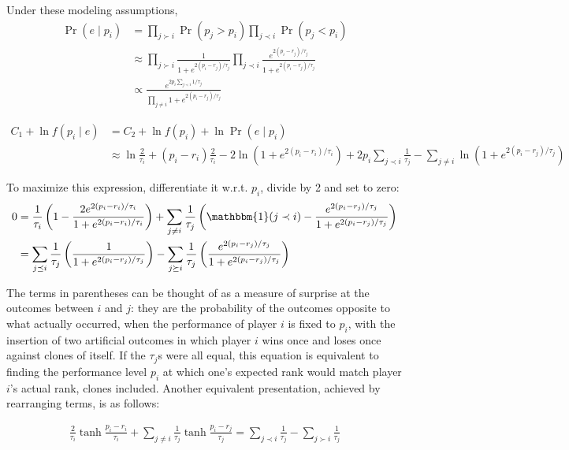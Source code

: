 \documentclass{article}
\begin{document}
Under these modeling assumptions,
\begin{align}
\Pr(e\mid p_i) &= \prod_{j \succ i} \Pr(p_j > p_i) \prod_{j \prec i} \Pr(p_j < p_i)
\\&\approx \prod_{j \succ i} \frac {1} {1 + e^{2(p_i-r_j)/\tau_j}} \prod_{j \prec i} \frac {e^{2(p_i-r_j)/\tau_j}} {1 + e^{2(p_i-r_j)/\tau_j}}
\\&\propto \frac {e^{2p_i\sum_{j\prec i}1/\tau_j}} {\prod_{j\neq i} 1 + e^{2(p_i-r_j)/\tau_j}}
\end{align}

\begin{align}
C_1 + \ln f(p_i\mid e) &= C_2 + \ln f(p_i) + \ln \Pr(e\mid p_i)
\\&\approx \ln \frac{2}{\tau_i} + (p_i-r_i)\frac{2}{\tau_i} - 2\ln\left(1 + e^{2(p_i-r_i)/\tau_i} \right) + 2p_i\sum_{j\prec i} \frac{1}{\tau_j} - \sum_{j\neq i} \ln\left(1 + e^{2(p_i-r_j)/\tau_j}\right)
\end{align}

To maximize this expression, differentiate it w.r.t. $p_i$, divide by 2 and set to zero:
\begin{align}
0 &= \frac{1}{\tau_i}\left(1 - \frac {2e^{2(p_i-r_i)/\tau_i}} {1 + e^{2(p_i-r_i)/\tau_i}} \right) + \sum_{j\neq i}\frac{1}{\tau_j}\left(\mathbbm{1}(j\prec i) - \frac {e^{2(p_i-r_j)/\tau_j}} {1 + e^{2(p_i-r_j)/\tau_j}} \right)
\\&= \sum_{j\preceq i}\frac{1}{\tau_j}\left(\frac {1} {1 + e^{2(p_i-r_j)/\tau_j}} \right)
	- \sum_{j\succeq i}\frac{1}{\tau_j}\left(\frac {e^{2(p_i-r_j)/\tau_j}} {1 + e^{2(p_i-r_j)/\tau_j}} \right)
\end{align}

The terms in parentheses can be thought of as a measure of surprise at the outcomes between $i$ and $j$: they are the probability of the outcomes opposite to what actually occurred, when the performance of player $i$ is fixed to $p_i$, with the insertion of two artificial outcomes in which player $i$ wins once and loses once against clones of itself. If the $\tau_j$s were all equal, this equation is equivalent to finding the performance level $p_i$ at which one's expected rank would match player $i$'s actual rank, clones included. Another equivalent presentation, achieved by rearranging terms, is as follows:

\begin{align}
\frac{2}{\tau_i} \tanh\frac {p_i - r_i} {\tau_i} + \sum_{j\neq i}\frac{1}{\tau_j} \tanh\frac {p_i - r_j} {\tau_j} = \sum_{j\prec i} \frac{1}{\tau_j} - \sum_{j\succ i} \frac{1}{\tau_j}
\end{align}
\end{document}
